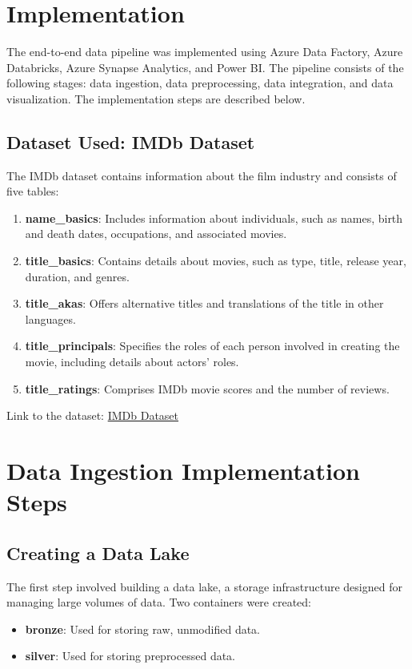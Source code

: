 \documentclass[a4paper,12pt]{article}
\begin{document}
\section{Implementation}
\label{sec:implementation}

The end-to-end data pipeline was implemented using Azure Data Factory, Azure Databricks, Azure Synapse Analytics, and Power BI. The pipeline consists of the following stages: data ingestion, data preprocessing, data integration, and data visualization. The implementation steps are described below.

\subsection{Dataset Used: IMDb Dataset}

The IMDb dataset contains information about the film industry and consists of five tables:
\begin{enumerate}
    \item \textbf{name\_basics}: Includes information about individuals, such as names, birth and death dates, occupations, and associated movies.
    \item \textbf{title\_basics}: Contains details about movies, such as type, title, release year, duration, and genres.
    \item \textbf{title\_akas}: Offers alternative titles and translations of the title in other languages.
    \item \textbf{title\_principals}: Specifies the roles of each person involved in creating the movie, including details about actors' roles.
    \item \textbf{title\_ratings}: Comprises IMDb movie scores and the number of reviews.
\end{enumerate}

Link to the dataset: \href{https://www.kaggle.com/datasets/ashirwadsangwan/imdb-dataset/data}{IMDb Dataset}

\section{Data Ingestion Implementation Steps}

\subsection{Creating a Data Lake}
The first step involved building a data lake, a storage infrastructure designed for managing large volumes of data. Two containers were created:
\begin{itemize}
    \item \textbf{bronze}: Used for storing raw, unmodified data.
    \item \textbf{silver}: Used for storing preprocessed data.
\end{itemize}
\end{document}

